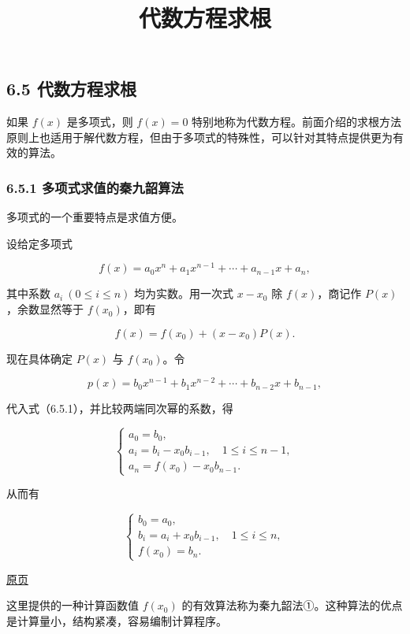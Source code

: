 \documentclass[
  10pt,
  fontset=fandol]{ctexart}
\title{代数方程求根}
\author{}
\date{}
\begin{document}
\maketitle

\subsection{6.5 代数方程求根}\label{ux4ee3ux6570ux65b9ux7a0bux6c42ux6839}

如果 \(f(x)\) 是多项式，则 \(f(x)=0\) 特别地称为代数方程。前面介绍的求根方法原则上也适用于解代数方程，但由于多项式的特殊性，可以针对其特点提供更为有效的算法。

\subsubsection{6.5.1 多项式求值的秦九韶算法}\label{ux591aux9879ux5f0fux6c42ux503cux7684ux79e6ux4e5dux97f6ux7b97ux6cd5}

多项式的一个重要特点是求值方便。

设给定多项式

\[
f(x)=a_0x^n+a_1x^{n-1}+\cdots+a_{n-1}x+a_n,
\]

其中系数 \(a_i\ (0\leqslant i\leqslant n)\) 均为实数。用一次式 \(x-x_0\) 除 \(f(x)\)，商记作 \(P(x)\)，余数显然等于 \(f(x_0)\)，即有

\[
f(x)=f(x_0)+(x-x_0)P(x).
\tag{6.5.1}
\]

现在具体确定 \(P(x)\) 与 \(f(x_0)\)。令

\[
p(x)=b_0x^{n-1}+b_1x^{n-2}+\cdots+b_{n-2}x+b_{n-1},
\]

代入式（6.5.1），并比较两端同次幂的系数，得

\[
\begin{cases}
a_0=b_0,\\
a_i=b_i-x_0b_{i-1},\quad1\leqslant i\leqslant n-1,\\
a_n=f(x_0)-x_0b_{n-1}.
\end{cases}
\]

从而有

\[
\begin{cases}
b_0=a_0,\\
b_i=a_i+x_0b_{i-1},\quad1\leqslant i\leqslant n,\\
f(x_0)=b_n.
\end{cases}
\tag{6.5.2}
\]

\href{../../source-images/pdf-172.jpeg}{原页}

这里提供的一种计算函数值 \(f(x_0)\) 的有效算法称为秦九韶法①。这种算法的优点是计算量小，结构紧凑，容易编制计算程序。
\end{document}
